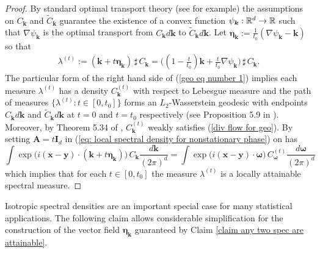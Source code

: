 \documentclass[10pt,noinfoline]{imsart}
\newcommand{\bs}{\boldsymbol}
\begin{document}
\begin{proof}
By standard optimal transport theory (see \cite{villani2003topics} for example) the assumptions on $C_{\bs k}$ and $\tilde C_{\bs k}$ guarantee the existence of a convex function $\psi_{\bs k}:\Bbb R^d \rightarrow \Bbb R$ such that $\nabla \psi_{\bs k}$ is the optimal transport from $C_{\bs k}d\bs k$ to $\tilde C_{\bs k}d\bs k$.  Let $\bs \eta_{\bs k}:= \frac{1}{t_0}(\nabla \psi_{\bs k}-\bs k)$ so that
\begin{align}
\label{geo eq number 1}
\lambda^{(t)}:=(\bs k + t\bs\eta_{\bs k})\,\sharp\, C_{\bs k} = \big((1-\textstyle\frac{t}{t_0})\bs k + \textstyle\frac{t}{t_0}\nabla\psi_{\bs k}\big)\,\sharp\, C_{\bs k}. 
\end{align}
The particular form of the right hand side of (\ref{geo eq number 1})  implies each measure $\lambda^{(t)}$ has a density $C_{\bs k}^{(t)}$ with respect to Lebesgue measure and the path of measures $\{\lambda^{(t)}\colon t\in[0,t_0] \}$ forms an $L_2$-Wasserstein geodesic with endpoints $C_{\bs k}d\bs k$ and $\tilde C_{\bs k}d\bs k$ at $t=0$ and $t=t_0$ respectively (see Proposition 5.9 in \cite{villani2003topics}). Moreover, by Theorem 5.34 of \cite{villani2003topics},  $C^{(t)}_{\bs k}$ weakly satisfies (\ref{div flow for geo}).
By  setting $\bs A=t\bs I_d$ in (\ref{eq: local spectral density for nonstationary phase}) on has
\[
\int  \exp\!\big(i(\bs x-\bs y)\!\cdot\! (\bs k + t\bs\eta_{\bs k})\big)\, C_{\bs k}\frac{d\bs k}{(2\pi)^d} 
=\int \exp\!\big(i(\bs x-\bs y)\!\cdot\! \bs\omega\big)\,  C^{(t)}_{\bs \omega}\frac{d\bs \omega}{(2\pi)^d}
\]
which implies that for each $t\in[0,t_0]$ the measure $\lambda^{(t)}$ is a locally attainable spectral measure.
\end{proof}

Isotropic spectral densities are an important special case for many statistical applications. The following claim allows considerable simplification for the construction of the vector field $\bs \eta_{\bs k}$ guaranteed by Claim \ref{claim any two spec are attainable}.
\end{document}
